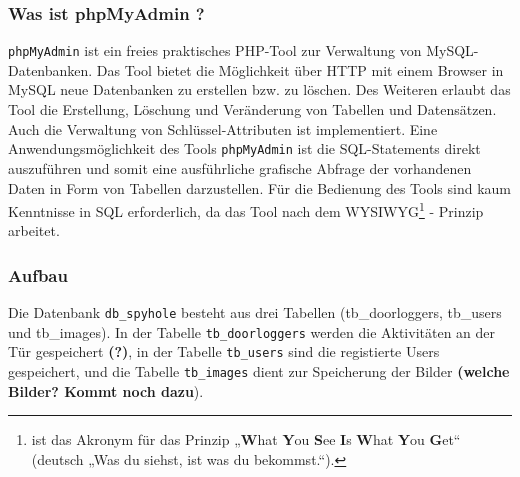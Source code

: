 \subsubsection{Was ist phpMyAdmin ?}
\texttt{phpMyAdmin} ist ein freies praktisches PHP-Tool zur Verwaltung von MySQL-Datenbanken. Das Tool bietet die Möglichkeit über HTTP mit einem Browser in MySQL neue Datenbanken zu erstellen bzw. zu löschen. Des Weiteren erlaubt das Tool die Erstellung, Löschung und Veränderung von Tabellen und Datensätzen. Auch die Verwaltung von Schlüssel-Attributen ist implementiert. Eine Anwendungsmöglichkeit des Tools \texttt{phpMyAdmin} ist die SQL-Statements direkt auszuführen und somit eine ausführliche grafische Abfrage der vorhandenen Daten in Form von Tabellen darzustellen. Für die Bedienung des Tools sind kaum Kenntnisse in SQL erforderlich, da das Tool nach dem WYSIWYG\footnote{ist das Akronym für das Prinzip „\textbf{W}hat \textbf{Y}ou \textbf{S}ee \textbf{I}s \textbf{W}hat \textbf{Y}ou \textbf{G}et“ (deutsch „Was du siehst, ist was du bekommst.“).} - Prinzip arbeitet.

\subsubsection{Aufbau}
				
Die Datenbank \texttt{db\_spyhole} besteht aus drei Tabellen (tb\_doorloggers, tb\_users und tb\_images). In der  Tabelle \texttt{tb\_doorloggers} werden die Aktivitäten an der Tür gespeichert \textbf{(?)}, in der Tabelle \texttt{tb\_users} sind die registierte Users gespeichert, und die Tabelle \texttt{tb\_images} dient zur Speicherung der Bilder \textbf{(welche Bilder? Kommt noch dazu}).  

